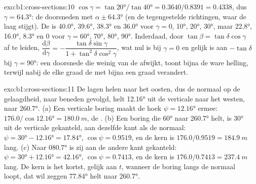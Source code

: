\begin{solution}{exo:b1:cross-sections:10}
$\cos\gamma = \tan\ang{20}/\tan\ang{40} = 0.3640/0.8391 = 0.4338$, dus
$\gamma = \ang{64.3}$: de doorsneden met  $\alpha \pm \ang{64.3}$ (en de tegengestelde richtingen, waar de
laag stijgt). De  is \ang{40.0}, \ang{39.6}, \ang{38.3} en \ang{36.0} voor $\gamma = 0$, \ang{10},
\ang{20}, \ang{30}, maar \ang{22.8}, \ang{16.0}, \ang{8.3} en $0$ voor
$\gamma = \ang{60}$, \ang{70}, \ang{80}, \ang{90}. Inderdaad, door $\tan\beta = \tan\delta\cos\gamma$ af te
leiden,
$\dfrac{\mathrm d\beta}{\mathrm d\gamma} =
-\dfrac{\tan\delta\sin\gamma}{1 + \tan^2\delta\cos^2\gamma}$, wat nul is bij $\gamma = 0$ en gelijk is aan
$-\tan\delta$ bij $\gamma = \ang{90}$: een doorsnede die weinig van de  afwijkt, toont bijna de
ware helling, terwijl nabij de  elke graad  de  met bijna een graad verandert.
\end{solution}

\begin{solution}{exo:b1:cross-sections:11}
De lagen helen naar het oosten, dus de normaal op de gelaagdheid, naar beneden gevolgd, helt \ang{12.16} uit de
verticale naar het westen, naar \ang{260.7}. (a) Een verticale boring maakt de hoek $\psi = \ang{12.16}$ ermee:
$176.0/\cos\ang{12.16} = \qty{180.0}{m}$, de . (b) Een boring die \ang{60} naar \ang{260.7} helt, is
\ang{30} uit de verticale gekanteld, aan dezelfde kant als de normaal: $\psi = \ang{30} - \ang{12.16} =
\ang{17.84}$, $\cos\psi = 0.9519$, en de kern is $176.0/0.9519 =
\qty{184.9}{m}$ lang. (c) Naar \ang{080.7} is zij aan de andere kant gekanteld: $\psi = \ang{30} + \ang{12.16} = \ang{42.16}$,
$\cos\psi = 0.7413$, en de kern is $176.0/0.7413 = \qty{237.4}{m}$ lang. De kern is het kortst, gelijk aan
$t$, wanneer de boring langs de normaal loopt, dat wil zeggen \ang{77.84} helt naar \ang{260.7}.
\end{solution}

